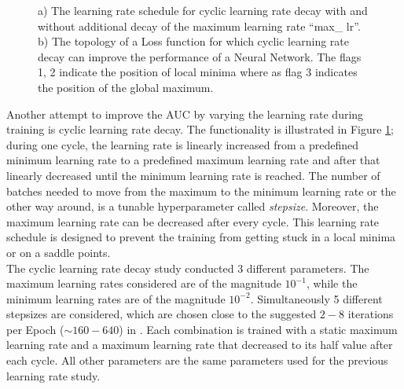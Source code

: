 \begin{figure}[H]
\begin{subfigure}{.5\textwidth}
  \caption{}
\end{subfigure}
\caption{a) The learning rate schedule for cyclic learning rate decay with and without additional decay of the maximum learning rate ``max\_ lr''. b) The topology of a Loss function for which cyclic learning rate decay can improve the performance of a Neural Network. The flags 1, 2 indicate the position of local minima where as flag 3 indicates the position of the global maximum. \cite{cyl1,cyl2}}
\label{fig:CylicTrain}
\end{figure}

Another attempt to improve the AUC by varying the learning rate during training is cyclic learning rate decay. The functionality is illustrated in Figure \ref{fig:CylicTrain}; during one cycle, the learning rate is linearly increased from a predefined minimum learning rate to a predefined maximum learning rate and after that linearly decreased until the minimum learning rate is reached. The number of batches needed to move from the maximum to the minimum learning rate or the other way around, is a tunable hyperparameter called \textit{stepsize}. Moreover, the maximum learning rate can be decreased after every cycle. This learning rate schedule is designed to prevent the training from getting stuck in a local minima or on a saddle points. \\
The cyclic learning rate decay study conducted 3 different parameters. The maximum learning rates considered are of the magnitude $10^{-1}$, while the minimum learning rates are of the magnitude $10^{-2}$. Simultaneously 5 different stepsizes are considered, which are chosen close to the suggested $2-8$ iterations per Epoch ($\sim 160 - 640$) in \cite{stepsize}. Each combination is trained with a static maximum learning rate and a maximum learning rate that decreased to its half value after each cycle. All other parameters are the same parameters used for the previous learning rate study. \\

